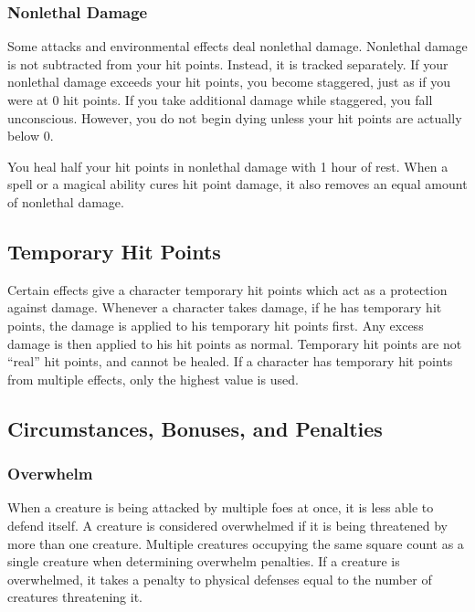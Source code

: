         \subsubsection{Nonlethal Damage}\label{Nonlethal Damage}
            Some attacks and environmental effects deal nonlethal damage.
            Nonlethal damage is not subtracted from your hit points.
            Instead, it is tracked separately.
            If your nonlethal damage exceeds your hit points, you become staggered, just as if you were at 0 hit points.
            If you take additional damage while staggered, you fall unconscious.
            However, you do not begin dying unless your hit points are actually below 0.

            You heal half your hit points in nonlethal damage with 1 hour of rest.
            When a spell or a magical ability cures hit point damage, it also removes an equal amount of nonlethal damage.

    \subsection{Temporary Hit Points}\label{Temporary Hit Points}
        Certain effects give a character temporary hit points which act as a protection against damage.
        Whenever a character takes damage, if he has temporary hit points, the damage is applied to his temporary hit points first.
        Any excess damage is then applied to his hit points as normal.
        Temporary hit points are not ``real'' hit points, and cannot be healed.
        If a character has temporary hit points from multiple effects, only the highest value is used.

    \subsection{Circumstances, Bonuses, and Penalties}

        \subsubsection{Overwhelm}\label{Overwhelm}
            When a creature is being attacked by multiple foes at once, it is less able to defend itself.
            A creature is considered overwhelmed if it is being threatened by more than one creature.
            Multiple creatures occupying the same square count as a single creature when determining overwhelm penalties.
            If a creature is overwhelmed, it takes a penalty to physical defenses equal to the number of creatures threatening it.


